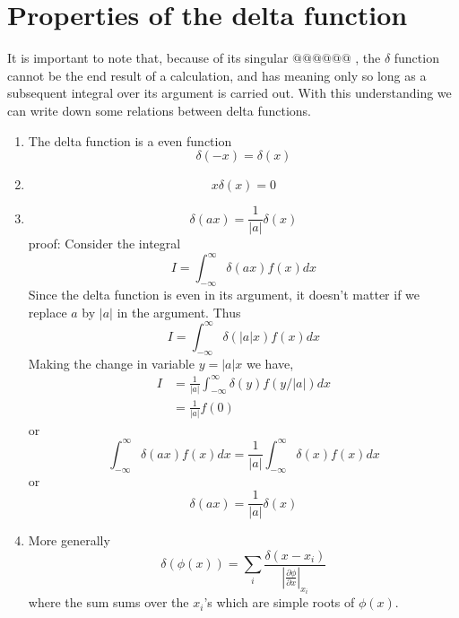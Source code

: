 	\section{Properties of the delta function}
		It is important to note that, because of its singular $@@@@@@$ , the $\delta$ function cannot be the end result of a calculation, and has meaning only so long as a subsequent integral over its argument is carried out. With this understanding we can write down some relations between delta functions.
		\begin{enumerate}[label=\textbf{Property \ \arabic*},start=1]
			\item 
			The delta function is a even function
			\begin{equation}
				\delta(-x) = \delta(x)
			\end{equation}
			
			\item
			\begin{equation}
				x \delta(x) = 0
			\end{equation}
			
			\item
			\begin{equation}
			\delta(a x) = \frac{1}{|a|} \delta(x)
			\end{equation}
			proof: Consider the integral
			\begin{equation}
				I = \int_{-\infty}^{\infty} \delta(a x) f(x) dx
			\end{equation}
			Since the delta function is even in its argument, it doesn't matter if we replace $a$ by $|a|$ in the argument. Thus
			\begin{equation}
				I = \int_{-\infty}^{\infty} \delta(|a| x) f(x) dx
			\end{equation}
			Making the change in variable $ y = |a| x$ we have,
			\begin{eqnarray}
				I &= \frac{1}{|a|}\int_{-\infty}^{\infty} \delta(y) f(y/|a|) dx \nonumber \\
				&= \frac{1}{|a|} f(0) \nonumber
			\end{eqnarray}			
			or
			\begin{equation}
				\int_{-\infty}^{\infty} \delta(a x) f(x) dx = \frac{1}{|a|} \int_{-\infty}^{\infty} \delta(x) f(x) dx
			\end{equation}
			or
			\begin{equation}
				\delta(a x) = \frac{1}{|a|} \delta(x)
			\end{equation}
			
			
			\item
			More generally
			\begin{equation}
				\delta(\phi(x)) = \sum_{i} \frac{\delta(x - x_i)}{\left|\frac{\partial\phi}{\partial x}\right|_{x_i}}
			\end{equation}
			where the sum sums over the $x_i$'s which are simple roots of $\phi(x)$.
			

\end{enumerate}
